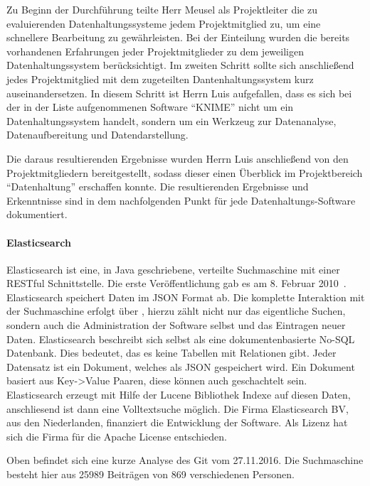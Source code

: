 Zu Beginn der Durchführung teilte Herr Meusel als Projektleiter die zu
evaluierenden Datenhaltungssysteme jedem Projektmitglied zu, um eine schnellere
Bearbeitung zu gewährleisten. Bei der Einteilung wurden die bereits vorhandenen
Erfahrungen jeder Projektmitglieder zu dem jeweiligen Datenhaltungssystem
berücksichtigt. Im zweiten Schritt sollte sich anschließend jedes
Projektmitglied mit dem zugeteilten Dantenhaltungssystem kurz
auseinandersetzen. In diesem Schritt ist Herrn Luis aufgefallen, dass es sich
bei der in der Liste aufgenommenen Software ``KNIME'' nicht um ein
Datenhaltungssystem handelt, sondern um ein Werkzeug zur Datenanalyse,
Datenaufbereitung und Datendarstellung.

Die daraus resultierenden Ergebnisse wurden Herrn Luis anschließend von den
Projektmitgliedern bereitgestellt, sodass dieser einen Überblick im
Projektbereich ``Datenhaltung'' erschaffen konnte. Die resultierenden
Ergebnisse und Erkenntnisse sind in dem nachfolgenden Punkt für jede
Datenhaltungs-Software dokumentiert.
\nl%

\paragraph{Elasticsearch}
\label{paragraph:elasticsearch}
Elasticsearch ist eine, in Java geschriebene, verteilte Suchmaschine mit einer
\gls{RESTful} Schnittstelle. Die erste Veröffentlichung gab es am 8. Februar
2010~\cite{es_release}. Elasticsearch speichert Daten im \gls{JSON} Format ab.
Die komplette Interaktion mit der Suchmaschine erfolgt über
, hierzu zählt nicht nur das eigentliche Suchen, sondern
auch die Administration der Software selbst und das Eintragen neuer Daten.
Elasticsearch beschreibt sich selbst als eine dokumentenbasierte No-SQL
Datenbank. Dies bedeutet, das es keine Tabellen mit Relationen gibt. Jeder
Datensatz ist ein Dokument, welches als \gls{JSON} gespeichert wird. Ein
Dokument basiert aus Key->Value Paaren, diese können auch geschachtelt sein.
Elasticsearch erzeugt mit Hilfe der \gls{Lucene} Bibliothek Indexe auf diesen
Daten, anschliesend ist dann eine Volltextsuche möglich. Die Firma
Elasticsearch BV, aus den Niederlanden, finanziert die Entwicklung der
Software. Als Lizenz hat sich die Firma für die Apache License entschieden.



Oben befindet sich eine kurze Analyse des \gls{Git}
 vom 27.11.2016. Die Suchmaschine besteht
hier aus 25989 Beiträgen von 869 verschiedenen Personen.

